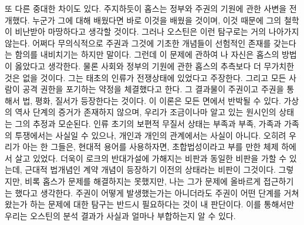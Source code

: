 또 다른 중대한 차이도 있다.
주지하듯이 홉스는 정부와 주권의 기원에 관한 사변을 전개했다.
누군가 그에 대해 배웠다면 바로 이것을 배웠을 것이며,
이것 때문에 그의 철학이 비난받아 마땅하다고 생각할 것이다.
그러나 오스틴은 이런 탐구로는 거의 나아가지 않는다.
어쩌다 무의식적으로 주권과 그것에 기초한 개념들이 선험적인 존재를
갖는다는 함의를 내비치기는 하지만 말이다.
그런데
이 문제에 관하여 나 자신은 홉스의 방법이 옳았다고 생각한다.
물론 사회와 정부의 기원에 관한 홉스의 추측보다 더 무가치한 것은 없을 것이다.
그는 태초의 인류가 전쟁상태에 있었다고 주장한다.
그리고 모든 사람이 공격 권한을 포기하는 약정을 체결했다고 한다.
그 결과물이 주권이고 주권을 통해서 법, 평화, 질서가 등장한다는 것이다.
이 이론은 모든 면에서 반박될 수 있다.
가상의 역사 단계의 증거가 존재하지 않으며,
우리가 조금이나마 알고 있는 원시인의 상태는 그의 추정과 모순된다.
인류 초기의 보편적 무질서 상태는 부족과 부족, 가족과 가족의 투쟁에서는
사실일 수 있으나, 개인과 개인의 관계에서는 사실이 아니다.
오히려 우리가 아는 한 그들은, 현대적 용어를 사용하자면,
초합법성이라고 부를 만한 체제 하에서 살고 있었다.
더욱이 로크의 반대가설에 가해지는 비판과 동일한 비판을 가할 수 있는데,
근대적 법개념인 계약 개념이 등장하기 이전의 상태라는 비판이 그것이다.
그렇지만,
비록 홉스가 문제를 해결하지는 못했지만,
나는 그가 문제에 올바르게 접근하기는 했다고 생각한다.
주권이 어떻게 발생했는가는 아니더라도
주권이 어떤 단계를 거쳐왔는가 하는 문제에 대한 탐구는
반드시 필요하다는 것이 내 판단이다.
이를 통해서만 우리는
오스틴의 분석 결과가 사실과 얼마나 부합하는지 알 수 있다.

